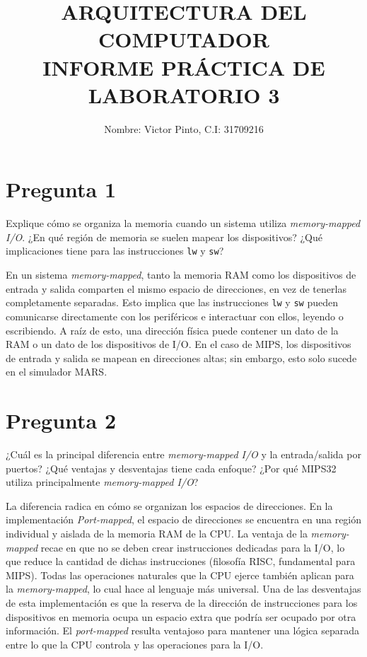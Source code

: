 \documentclass[12pt]{article}
\title{ARQUITECTURA DEL COMPUTADOR \\ INFORME PRÁCTICA DE LABORATORIO 3}
\author{Nombre: Victor Pinto, C.I: 31709216}
\date{}
\begin{document}
\maketitle

\section*{Pregunta 1}
Explique cómo se organiza la memoria cuando un sistema utiliza \textit{memory-mapped I/O}. ¿En qué región de memoria se suelen mapear los dispositivos? ¿Qué implicaciones tiene para las instrucciones \texttt{lw} y \texttt{sw}?

En un sistema \textit{memory-mapped}, tanto la memoria RAM como los dispositivos de entrada y salida comparten el mismo espacio de direcciones, en vez de tenerlas completamente separadas. Esto implica que las instrucciones \texttt{lw} y \texttt{sw} pueden comunicarse directamente con los periféricos e interactuar con ellos, leyendo o escribiendo. A raíz de esto, una dirección física puede contener un dato de la RAM o un dato de los dispositivos de I/O. En el caso de MIPS, los dispositivos de entrada y salida se mapean en direcciones altas; sin embargo, esto solo sucede en el simulador MARS.

\section*{Pregunta 2}
¿Cuál es la principal diferencia entre \textit{memory-mapped I/O} y la entrada/salida por puertos? ¿Qué ventajas y desventajas tiene cada enfoque? ¿Por qué MIPS32 utiliza principalmente \textit{memory-mapped I/O}?

La diferencia radica en cómo se organizan los espacios de direcciones. En la implementación \textit{Port-mapped}, el espacio de direcciones se encuentra en una región individual y aislada de la memoria RAM de la CPU. La ventaja de la \textit{memory-mapped} recae en que no se deben crear instrucciones dedicadas para la I/O, lo que reduce la cantidad de dichas instrucciones (filosofía RISC, fundamental para MIPS). Todas las operaciones naturales que la CPU ejerce también aplican para la \textit{memory-mapped}, lo cual hace al lenguaje más universal. Una de las desventajas de esta implementación es que la reserva de la dirección de instrucciones para los dispositivos en memoria ocupa un espacio extra que podría ser ocupado por otra información. El \textit{port-mapped} resulta ventajoso para mantener una lógica separada entre lo que la CPU controla y las operaciones para la I/O.
\end{document}
